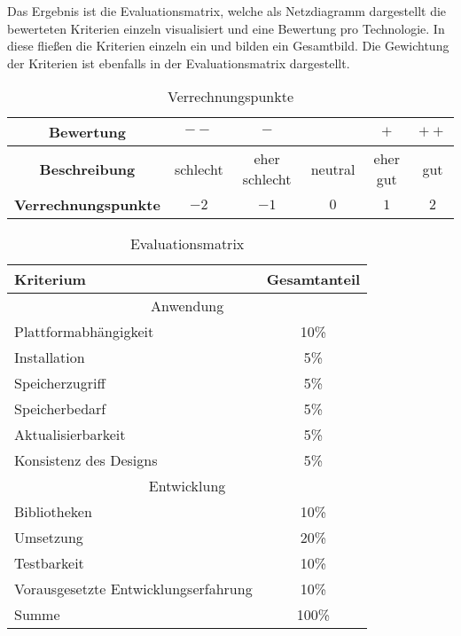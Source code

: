 Das Ergebnis ist die Evaluationsmatrix, welche als Netzdiagramm dargestellt die bewerteten Kriterien einzeln visualisiert und eine Bewertung pro Technologie. In diese fließen die Kriterien einzeln ein und bilden ein Gesamtbild. Die Gewichtung der Kriterien ist ebenfalls in der Evaluationsmatrix dargestellt.
\begin{table}[h]
	\centering
	\begin{tabular}{|c|c|c|c|c|c|}
		\hline 	
			\textbf{Bewertung} & $--$ & $-$ & \Circle & $+$ & $++$ \\ 
		\hline 
			\textbf{Beschreibung} & schlecht & eher schlecht & neutral & eher gut & gut \\ 
		\hline 
			\textbf{Verrechnungspunkte} & $-2$ & $-1$ & $0$ & $1$ & $2$ \\ 
		\hline 		
	\end{tabular} 
	\caption{Verrechnungspunkte} \label{tab:verrechnungspunkte}
\end{table}

\begin{table}[h]
	\centering
	\begin{tabular}{|l|c|}
		\hline
		Kriterium              & Gesamtanteil \\
		\hline
		\multicolumn{2}{c}{Anwendung}     \\
		\hline
		Plattformabhängigkeit   & 10\%         \\
		Installation           & 5\%          \\
		Speicherzugriff        & 5\%          \\
		Speicherbedarf         & 5\%          \\
		Aktualisierbarkeit     & 5\%          \\
		Konsistenz des Designs & 5\%         \\
		
		\hline
		\multicolumn{2}{c}{Entwicklung}     \\
		\hline
		Bibliotheken           & 10\%         \\
		Umsetzung              & 20\%         \\
		Testbarkeit            & 10\%         \\
		Vorausgesetzte Entwicklungserfahrung    & 10\%         \\
		\hline
		\hline
		Summe                  & 100\%        \\
		\hline
	\end{tabular}
	\caption{Evaluationsmatrix} \label{tab:punktekatalog}
\end{table}

